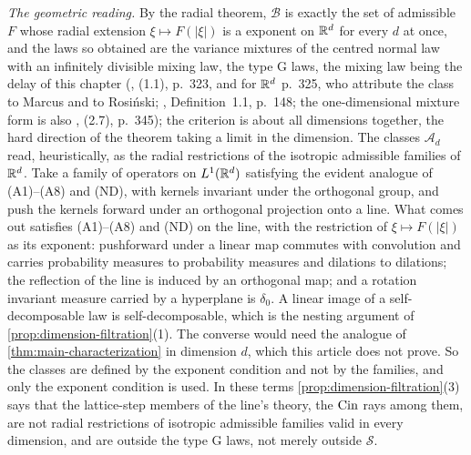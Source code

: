 \begin{remark}\label{rem:dimension-filtration}
\emph{The geometric reading.} By the radial theorem, $\mathcal{B}$ is exactly the set of
admissible $F$ whose radial extension $\xi \mapsto F(|\xi|)$ is a \Levy{} exponent on $\mathbb{R}^d$
for every $d$ at once, and the laws so obtained are the variance mixtures of the centred normal
law with an infinitely divisible mixing law, the type G laws, the mixing law being the delay of
this chapter (, (1.1), p.~323, and for $\mathbb{R}^d$ p.~325, who attribute the class to
Marcus and to Rosi\'nski; , Definition~1.1, p.~148; the
one-dimensional mixture form is also , (2.7), p.~345); the criterion is about all
dimensions together, the hard direction of the theorem taking a limit in the dimension. The
classes $\mathcal{A}_d$ read, heuristically, as the radial restrictions of the isotropic
admissible families of $\mathbb{R}^d$. Take a family of operators on $L^1(\mathbb{R}^d)$ satisfying the evident
analogue of (A1)--(A8) and (ND), with kernels invariant under the orthogonal group, and push the
kernels forward under an orthogonal projection onto a line. What comes out satisfies (A1)--(A8)
and (ND) on the line, with the restriction of $\xi \mapsto F(|\xi|)$ as its exponent: pushforward
under a linear map commutes with convolution and carries probability measures to probability
measures and dilations to dilations; the reflection of the line is induced by an orthogonal map;
and a rotation invariant measure carried by a hyperplane is $\delta_0$. A linear
image of a self-decomposable law is self-decomposable, which is the nesting argument of
\ref{prop:dimension-filtration}(1). The converse would need the analogue of
\ref{thm:main-characterization} in dimension $d$, which this article does not prove. So the
classes are defined by the exponent condition and not by the families, and only the exponent
condition is used. In these terms \ref{prop:dimension-filtration}(3) says that the lattice-step members
of the line's theory, the $\operatorname{Cin}$ rays among them, are not radial restrictions of isotropic
admissible families valid in every dimension, and are outside the type G laws, not merely
outside $\mathcal{S}$.


\end{remark}
